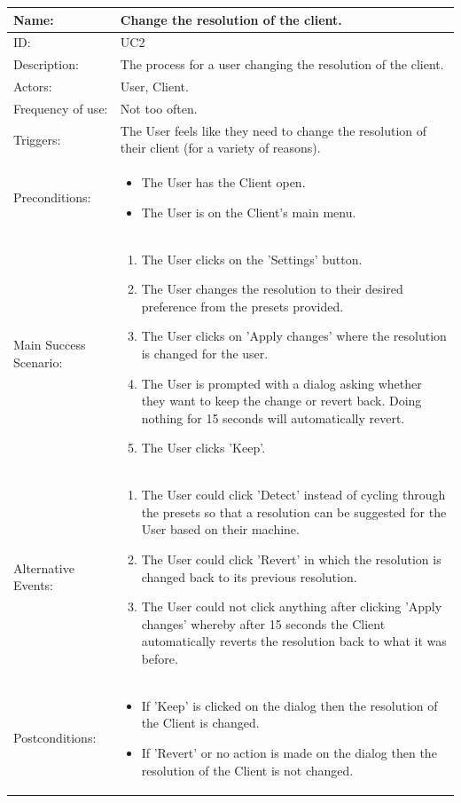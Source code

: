 \documentclass[12pt]{article}
\begin{document}
\begin{tabularx}{\textwidth}{|l|X|} \hline
Name: & \textbf{Change the resolution of the client.} \\ \hline
ID: & UC2 \\ \hline
Description: & The process for a user changing the resolution of the client. \\ \hline
Actors: & User, Client. \\ \hline
Frequency of use: & Not too often. \\ \hline
Triggers: & The User feels like they need to change the resolution of their client (for a variety of reasons). \\ \hline
Preconditions: & \begin{itemize}
\item The User has the Client open.
\item The User is on the Client's main menu.
\end{itemize} \\ \hline
Main Success Scenario: & \begin{enumerate}
\item The User clicks on the 'Settings' button.
\item The User changes the resolution to their desired preference from the presets provided.
\item The User clicks on 'Apply changes' where the resolution is changed for the user.
\item The User is prompted with a dialog asking whether they want to keep the change or revert back. Doing nothing for 15 seconds will automatically revert.
\item The User clicks 'Keep'.
\end{enumerate} \\ \hline
Alternative Events: & \begin{enumerate}
\item The User could click 'Detect' instead of cycling through the presets so that a resolution can be suggested for the User based on their machine.
\item The User could click 'Revert' in which the resolution is changed back to its previous resolution.
\item The User could not click anything after clicking 'Apply changes' whereby after 15 seconds the Client automatically reverts the resolution back to what it was before.
\end{enumerate} \\ \hline
Postconditions: & \begin{itemize}
\item If 'Keep' is clicked on the dialog then the resolution of the Client is changed.
\item If 'Revert' or no action is made on the dialog then the resolution of the Client is not changed.
\end{itemize} \\ \hline
\end{tabularx}
\end{document}
